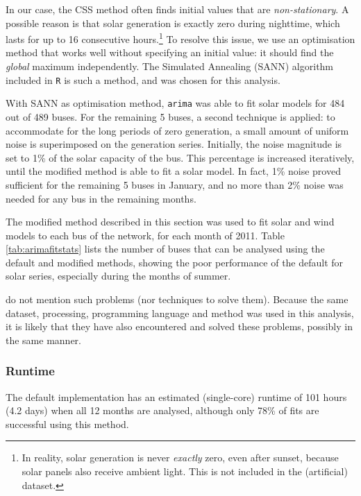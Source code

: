 \documentclass[main.tex]{subfiles}
\begin{document}
In our case, the CSS method often finds initial values that are \emph{non-stationary}. A possible reason is that solar generation is exactly zero during nighttime, which lasts for up to 16 consecutive hours.\footnote{In reality, solar generation is never \emph{exactly} zero, even after sunset, because solar panels also receive ambient light. This is not included in the (artificial) dataset.
}
To resolve this issue, we use an optimisation method that works well without specifying an initial value: it should find the \emph{global} maximum independently. The Simulated Annealing (SANN) algorithm included in \texttt{R} is such a method, and was chosen for this analysis.

With SANN as optimisation method, \texttt{arima} was able to fit solar models for 484 out of 489 buses. For the remaining 5 buses, a second technique is applied: to accommodate for the long periods of zero generation, a small amount of uniform noise is superimposed on the generation series. Initially, the noise magnitude is set to 1\% of the solar capacity of the bus. This percentage is increased iteratively, until the modified method is able to fit a solar model. In fact, 1\% noise proved sufficient for the remaining 5 buses in January, and no more than 2\% noise was needed for any bus in the remaining months.

The modified method described in this section was used to fit solar and wind models to each bus of the network, for each month of 2011. Table \ref{tab:arimafitstats} lists the number of buses that can be analysed using the default and modified methods, showing the poor performance of the default for solar series, especially during the months of summer.

\citet{Nesti2018emergentfailures} do not mention such problems (nor techniques to solve them). Because the same dataset, processing, programming language and method was used in this analysis, it is likely that they have also encountered and solved these problems, possibly in the same manner.

\subsubsection{Runtime}
The default implementation has an estimated (single-core) runtime of 101 hours (4.2 days) when all 12 months are analysed, although only 78\% of fits are successful using this method.
\end{document}
